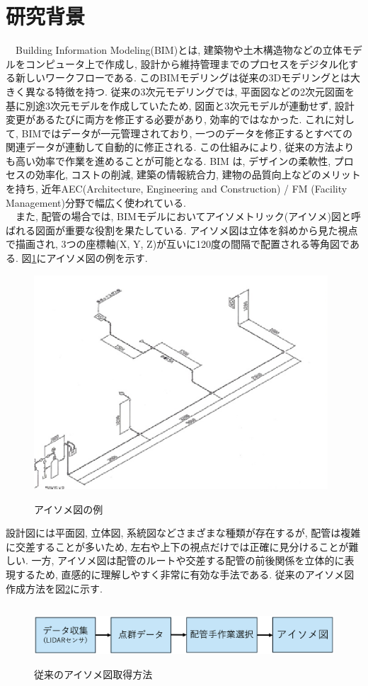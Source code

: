 \section{研究背景}
　Building Information Modeling(BIM)とは, 建築物や土木構造物などの立体モデルをコンピュータ上で作成し, 設計から維持管理までのプロセスをデジタル化する新しいワークフローである. 
このBIMモデリングは従来の3Dモデリングとは大きく異なる特徴を持つ. 
従来の3次元モデリングでは, 平面図などの2次元図面を基に別途3次元モデルを作成していたため, 図面と3次元モデルが連動せず, 設計変更があるたびに両方を修正する必要があり, 効率的ではなかった. 
これに対して, BIMではデータが一元管理されており, 一つのデータを修正するとすべての関連データが連動して自動的に修正される. 
この仕組みにより, 従来の方法よりも高い効率で作業を進めることが可能となる. 
BIM は, デザインの柔軟性, プロセスの効率化, コストの削減, 建築の情報統合力, 建物の品質向上などのメリットを持ち, 近年AEC(Architecture, Engineering and Construction) / FM (Facility Management)分野で幅広く使われている\cite{bib:5}\cite{bib:6}. \\
　また, 配管の場合では, BIMモデルにおいてアイソメトリック(アイソメ)図と呼ばれる図面が重要な役割を果たしている. 
アイソメ図は立体を斜めから見た視点で描画され, 3つの座標軸(X, Y, Z)が互いに120度の間隔で配置される等角図である. 
図\ref{fig:f1}にアイソメ図の例を示す. 
\begin{figure}[htbt]
	\centering
	 \includegraphics[height=80mm]{Figure/ex_iso.eps}
	 \label{fig:f1}
	 \caption{アイソメ図の例}
	 
\end{figure}
設計図には平面図, 立体図, 系統図などさまざまな種類が存在するが, 配管は複雑に交差することが多いため, 左右や上下の視点だけでは正確に見分けることが難しい. 
一方, アイソメ図は配管のルートや交差する配管の前後関係を立体的に表現するため, 直感的に理解しやすく非常に有効な手法である. 
従来のアイソメ図作成方法を図\ref{fig:f2}に示す. 
\begin{figure}[htbt]
	\centering
	 \includegraphics[height=22mm]{Figure/existing_research.eps}
	 \caption{従来のアイソメ図取得方法}
	 \label{fig:f2}
\end{figure}

